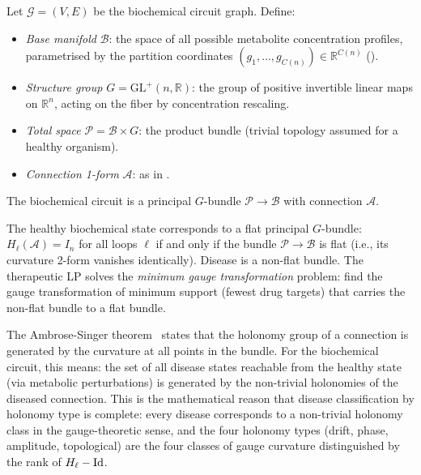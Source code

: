 \begin{definition}
\label{def:ch11-fiber-bundle}
Let $\mathcal{G} = (V, E)$ be the biochemical circuit graph.  Define:
\begin{itemize}
  \item \emph{Base manifold} $\mathcal{B}$: the space of all possible metabolite
    concentration profiles, parametrised by the partition coordinates
    $(g_1, \ldots, g_{C(n)}) \in \mathbb{R}^{C(n)}$ ().
  \item \emph{Structure group} $G = \mathrm{GL}^+(n,\mathbb{R})$: the group of
    positive invertible linear maps on $\mathbb{R}^n$, acting on the fiber by
    concentration rescaling.
  \item \emph{Total space} $\mathcal{P} = \mathcal{B} \times G$: the product
    bundle (trivial topology assumed for a healthy organism).
  \item \emph{Connection 1-form} $\mathcal{A}$: as in .
\end{itemize}
The biochemical circuit is a principal $G$-bundle $\mathcal{P} \to \mathcal{B}$
with connection $\mathcal{A}$.
\end{definition}

\begin{theorem}
\label{thm:ch11-flat-bundle}
The healthy biochemical state corresponds to a flat principal $G$-bundle:
$H_\ell(\mathcal{A}) = I_n$ for all loops $\ell$ if and only if the bundle
$\mathcal{P} \to \mathcal{B}$ is flat (i.e., its curvature 2-form vanishes
identically).  Disease is a non-flat bundle.  The therapeutic LP solves the
\emph{minimum gauge transformation} problem: find the gauge transformation
of minimum support (fewest drug targets) that carries the non-flat bundle to
a flat bundle.
\end{theorem}

The Ambrose-Singer theorem~\citep{AmbroseSinger1953} states that the holonomy
group of a connection is generated by the curvature at all points in the bundle.
For the biochemical circuit, this means: the set of all disease states
reachable from the healthy state (via metabolic perturbations) is generated
by the non-trivial holonomies of the diseased connection.  This is the
mathematical reason that disease classification by holonomy type is complete:
every disease corresponds to a non-trivial holonomy class in the gauge-theoretic
sense, and the four holonomy types (drift, phase, amplitude, topological) are
the four classes of gauge curvature distinguished by the rank of $H_\ell - \mathrm{Id}$.

